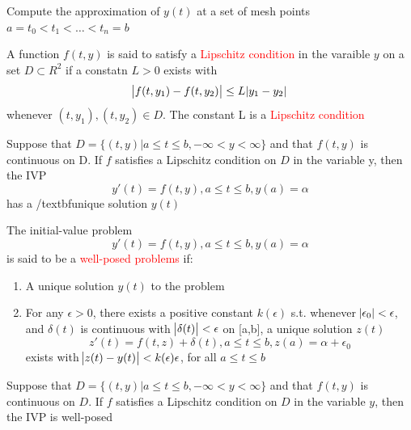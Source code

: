 \documentclass[11pt]{article}
\begin{document}
Compute the approximation of \(y(t)\) at a set of mesh points 
\(a=t_0<t_1<\dots<t_n=b\)

\begin{definition}
A function $f(t,y)$ is said to satisfy a \textcolor{red}{Lipschitz condition} in
the varaible $y$ on a set $D\subset R^2$ if a constatn $L>0$ exists with
\begin{equation*}
\abs{f(t,y_1)-f(t,y_2)}\le L\abs{y_1-y_2}
\end{equation*}
whenever $(t,y_1),(t,y_2)\in D$. The constant L is a 
\textcolor{red}{Lipschitz condition} 
\end{definition}

\begin{theorem}
Suppose that $D=\{(t,y)|a\le t\le b, -\infty<y<\infty\}$ and that $f(t,y)$ is continuous
on D. If $f$ satisfies a Lipschitz condition on $D$ in the variable y, then the IVP
\begin{equation*}
y'(t)=f(t,y), a\le t\le b, y(a) = \alpha
\end{equation*}
has a /textbf{unique solution} $y(t)$
\end{theorem}


\begin{definition}
The initial-value problem
\begin{equation*}
y'(t)=f(t,y), a\le t\le b, y(a)=\alpha
\end{equation*}
is said to be a \textcolor{red}{well-posed problems} if:
\begin{enumerate}
\item A unique solution $y(t)$ to the problem
\item For any $\epsilon>0$, there exists a positive constant $k(\epsilon)$ s.t.
whenever $\abs{\epsilon_0}<\epsilon$, and $\delta(t)$ is continuous with 
$\abs{\delta(t)}<\epsilon$ on [a,b], a unique solution $z(t)$ 
\begin{equation*}
z'(t)=f(t,z)+\delta(t), a\le t\le b, z(a)=\alpha+\epsilon_0
\end{equation*}
exists with $\abs{z(t)-y(t)}<k(\epsilon)\epsilon$, for all $a\le t\le b$
\end{enumerate}
\end{definition}

\begin{theorem}
Suppose that $D=\{(t,y)|a\le t\le b,-\infty<y<\infty\}$ and that $f(t,y)$ is continuous on $D$.
If $f$ satisfies a Lipschitz condition on $D$ in the variable $y$, then the IVP is well-posed
\end{theorem}
\end{document}
